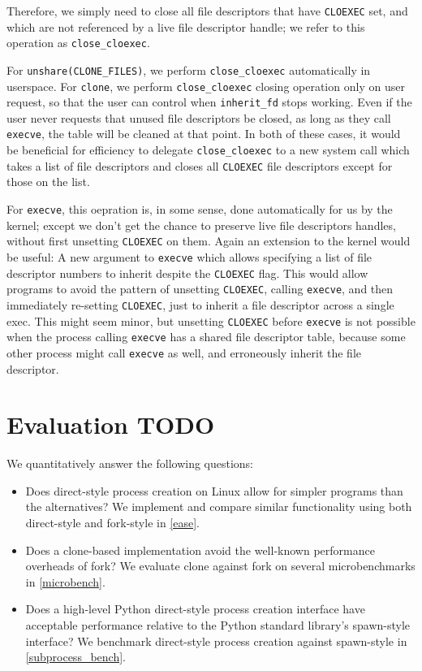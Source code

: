 \documentclass[sigplan]{acmart}
\begin{document}
Therefore, we simply need to close all file descriptors that have \texttt{CLOEXEC} set,
and which are not referenced by a live file descriptor handle;
we refer to this operation as \verb|close_cloexec|.

For \verb|unshare(CLONE_FILES)|, we perform \verb|close_cloexec| automatically in userspace.
For \texttt{clone}, we perform \verb|close_cloexec| closing operation only on user request,
so that the user can control when \verb|inherit_fd| stops working.
Even if the user never requests that unused file descriptors be closed,
as long as they call \texttt{execve}, the table will be cleaned at that point.
In both of these cases,
it would be beneficial for efficiency to delegate \verb|close_cloexec|
to a new system call which takes a list of file descriptors
and closes all \texttt{CLOEXEC} file descriptors except for those on the list.

For \texttt{execve}, this oepration is, in some sense, done automatically for us by the kernel;
except we don't get the chance to preserve live file descriptors handles,
without first unsetting \texttt{CLOEXEC} on them.
Again an extension to the kernel would be useful:
A new argument to \texttt{execve} which allows specifying a list of file descriptor numbers to inherit
despite the \texttt{CLOEXEC} flag.
This would allow programs to avoid the pattern
of unsetting \texttt{CLOEXEC}, calling \texttt{execve}, and then immediately re-setting \texttt{CLOEXEC},
just to inherit a file descriptor across a single exec.
This might seem minor,
but unsetting \texttt{CLOEXEC} before \texttt{execve} is not possible
when the process calling \texttt{execve} has a shared file descriptor table,
because some other process might call \texttt{execve} as well,
and erroneously inherit the file descriptor.
\section{Evaluation \textbf{TODO}}\label{evaluation}

We quantitatively answer the following questions:
\begin{itemize}
\item
  Does direct-style process creation on Linux allow for simpler programs than the alternatives?
  We implement and compare similar functionality using both direct-style and fork-style in \ref{ease}.
\item
  Does a clone-based implementation avoid the well-known performance overheads of fork?
  We evaluate clone against fork on several microbenchmarks in \ref{microbench}.
\item
  Does a high-level Python direct-style process creation interface
  have acceptable performance relative to the Python standard library's spawn-style interface?
  We benchmark direct-style process creation against spawn-style in \ref{subprocess_bench}.
\end{itemize}
\end{document}
